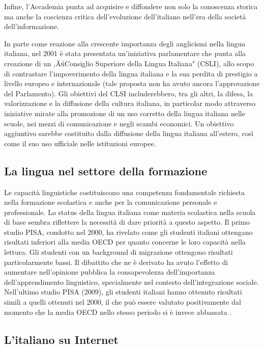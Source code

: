 \begin{multicols}{2}
Infine, l'Accademia
punta ad acquisire e diffondere non solo la conoscenza storica ma anche la
coscienza critica dell'evoluzione dell'italiano nell'era della societ\`{a}
dell'informazione.

In parte come reazione alla crescente importanza degli anglicismi nella lingua
italiana, nel 2001 \`{e} stata presentata un'iniziativa parlamentare che punta
alla creazione di un ‚ÄúConsiglio Superiore della Lingua Italiana" (CSLI), allo
scopo di contrastare l'impoverimento della lingua italiana e la sua perdita di
prestigio a livello europeo e internazionale (tale proposta non ha avuto
ancora l'approvazione del Parlamento). Gli obiettivi del CLSI includerebbero,
tra gli altri, la difesa, la valorizzazione e la diffusione della cultura
italiana, in particolar modo attraverso iniziative mirate alla promozione di
un uso corretto della lingua italiana nelle scuole, nei mezzi di comunicazione
e negli scambi economici. Un obiettivo aggiuntivo sarebbe costituito dalla
diffusione della lingua italiana all'estero, cos\`{i} come il suo uso
ufficiale nelle istituzioni europee.

\subsection{La lingua nel settore della formazione}

Le capacit\`{a} linguistiche costituiscono una competenza fondamentale
richiesta nella formazione scolastica e anche per la comunicazione personale e
professionale. Lo status della lingua italiana come materia scolastica nella
scuola di base sembra riflettere la necessit\`{a} di dare priorit\`{a} a
questo aspetto.
Il primo studio PISA, condotto nel 2000, ha rivelato come gli studenti
italiani ottengano risultati inferiori alla media OECD per quanto concerne le
loro capacit\`{a} nella lettura. Gli studenti con un background di migrazione
ottengono risultati particolarmente bassi. Il dibattito che ne \`{e} derivato
ha avuto l'effetto di aumentare nell'opinione pubblica la consapevolezza
dell'importanza dell'apprendimento linguistico, specialmente nel contesto
dell'integrazione sociale. Nell'ultimo studio PISA (2009), gli studenti
italiani hanno ottenuto risultati simili a quelli ottenuti nel 2000, il che
pu\`{o} essere valutato positivamente dal momento che la media OECD nello
stesso periodo si \`{e} invece abbassata \cite{Pisa1}.

\subsection{L'italiano su Internet}


\end{multicols}
